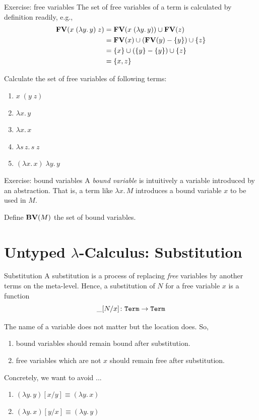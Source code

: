 \begin{frame}{Exercise: free variables}
  The set of free variables of a term is calculated by definition readily, e.g., 
    \begin{align*}
      \mathbf{FV}(x\;(\lambda y.\, y)\;z) & = \mathbf{FV}(x\;(\lambda y.\, y)) \cup \mathbf{FV}(z) \\ 
                                  & = \mathbf{FV}(x) \cup (\mathbf{FV}(y) - \{y\}) \cup \{z\} \\
                                  & = \{x\} \cup (\{y\}-\{y\}) \cup \{z\} \\
                                  & = \{x, z\}
    \end{align*}

  Calculate the set of free variables of following terms:
  \begin{enumerate}
    \item $x\;(y\; z) $
    \item $\lambda x.\, y$
    \item $\lambda x.\, x$
    \item $\lambda s\,z.\, s \;z$
    \item $(\lambda x.\, x)\;\lambda y.\, y$
  \end{enumerate}
\end{frame}

\begin{frame}{Exercise: bound variables}
  A \emph{bound variable} is intuitively a variable introduced by an abstraction.
  That is, a term like $\lambda x.\, M$ introduces a bound variable $x$ to
  be used in $M$. 

  Define $\mathbf{BV}(M)$ the set of bound variables.
\end{frame}

\section{Untyped $\lambda$-Calculus: Substitution}

\begin{frame}{Substitution}
   A \alert{substitution} is a process of replacing \emph{free} variables by
   another terms on the meta-level. Hence, a substitution of $N$ for a free
   variable $x$ is a function
   \[
     {\_}[{N}/{x}]\colon \mathtt{Term} \to \mathtt{Term}
   \]

   The name of a variable does not matter but the location does. So, 
   \begin{enumerate}
     \item bound variables should remain bound after substitution.
     \item free variables which are not $x$ should remain free after substitution.
   \end{enumerate}

   Concretely, we want to avoid ...
  \begin{enumerate}
    \item $(\lambda y.\,y)[x/y] \equiv (\lambda y.\, x)$
    \item $(\lambda y.\, x)[y/x] \equiv (\lambda y.\, y)$ 
  \end{enumerate}
   
  
\end{frame}
  
